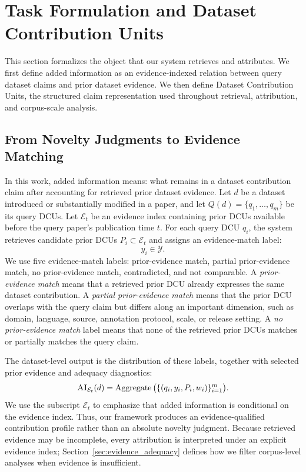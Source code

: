 \documentclass[11pt]{article}
\newcommand{\evidence}{\mathcal{E}}
\newcommand{\ai}{\textsc{AI}}
\begin{document}
\section{Task Formulation and Dataset Contribution Units}
This section formalizes the object that our system retrieves and attributes.
We first define added information as an evidence-indexed relation between query dataset claims and prior dataset evidence.
We then define Dataset Contribution Units, the structured claim representation used throughout retrieval, attribution, and corpus-scale analysis.
\subsection{From Novelty Judgments to Evidence Matching}
In this work, added information means: what remains in a dataset contribution claim after accounting for retrieved prior dataset evidence.
Let $d$ be a dataset introduced or substantially modified in a paper, and let $Q(d) = \{q_1, \ldots, q_m\}$ be its query DCUs.
Let $\evidence_t$ be an evidence index containing prior DCUs available before the query paper's publication time $t$.
For each query DCU $q_i$, the system retrieves candidate prior DCUs $P_i \subset \evidence_t$ and assigns an evidence-match label:
\begin{equation}
    y_i \in \mathcal{Y}.
\end{equation}
We use five evidence-match labels: prior-evidence match, partial prior-evidence match, no prior-evidence match, contradicted, and not comparable.
A \emph{prior-evidence match} means that a retrieved prior DCU already expresses the same dataset contribution.
A \emph{partial prior-evidence match} means that the prior DCU overlaps with the query claim but differs along an important dimension, such as domain, language, source, annotation protocol, scale, or release setting.
A \emph{no prior-evidence match} label means that none of the retrieved prior DCUs matches or partially matches the query claim.

The dataset-level output is the distribution of these labels, together with selected prior evidence and adequacy diagnostics:
\begin{equation}
    \ai_{\evidence_t}(d) = \operatorname{Aggregate}\big(\{(q_i, y_i, P_i, w_i)\}_{i=1}^m\big).
\end{equation}
We use the subscript $\evidence_t$ to emphasize that added information is conditional on the evidence index.
Thus, our framework produces an evidence-qualified contribution profile rather than an absolute novelty judgment.
Because retrieved evidence may be incomplete, every attribution is interpreted under an explicit evidence index; Section~\ref{sec:evidence_adequacy} defines how we filter corpus-level analyses when evidence is insufficient.
\end{document}
